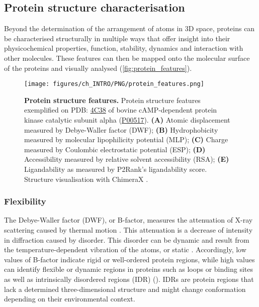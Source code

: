 \subsection{Protein structure characterisation}

Beyond the determination of the arrangement of atoms in 3D space, proteins can be characterised structurally in multiple ways that offer insight into their physicochemical properties, function, stability, dynamics and interaction with other molecules. These features can then be mapped onto the molecular surface of the proteins and visually analysed (\autoref{fig:protein_features}).

\begin{figure}[htb!]
    \centering
    \texttt{[image: figures/ch\_INTRO/PNG/protein\_features.png]}
    \caption[Protein structure features]{\textbf{Protein structure features.} Protein structure features exemplified on PDB: \href{https://www.ebi.ac.uk/pdbe/entry/pdb/4c38}{4C38} \cite{COUTY_2013_ONCO} of bovine cAMP-dependent protein kinase catalytic subunit alpha (\href{https://www.uniprot.org/uniprotkb/P00517/entry}{P00517}). \textbf{(A)} Atomic displacement measured by Debye-Waller factor (DWF); \textbf{(B)} Hydrophobicity measured by molecular lipophilicity potential (MLP); \textbf{(C)} Charge measured by Coulombic electrostatic potential (ESP); \textbf{(D)} Accessibility measured by relative solvent accessibility (RSA); \textbf{(E)} Ligandability as measured by P2Rank's ligandability score. Structure visualisation with ChimeraX \cite{PETTERSEN_2021_CHIMERAX}.}
    \label{fig:protein_features}
\end{figure}

\subsubsection{Flexibility}

The Debye-Waller factor (DWF), or B-factor, measures the attenuation of X-ray scattering caused by thermal motion \cite{DEBYE_1913_BFACTOR, WALLER_1923_BFACTOR}. This attenuation is a decrease of intensity in diffraction caused by disorder. This disorder can be dynamic and result from the temperature-dependent vibration of the atoms, or static \cite{SUN_2019_BFACTOR}. Accordingly, low values of B-factor indicate rigid or well-ordered protein regions, while high values can identify flexible or dynamic regions in proteins such as loops or binding sites as well as intrinsically disordered regions (IDR) (). IDRs are protein regions that lack a determined three-dimensional structure and might change conformation depending on their environmental context.

